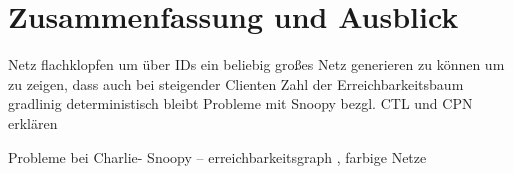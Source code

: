 \section{Zusammenfassung und Ausblick} 
Netz flachklopfen um über IDs ein beliebig großes Netz generieren zu können um zu zeigen, dass auch bei steigender Clienten Zahl der Erreichbarkeitsbaum gradlinig deterministisch bleibt
Probleme mit Snoopy bezgl. CTL und CPN erklären

Probleme bei Charlie- Snoopy -- erreichbarkeitsgraph , farbige Netze